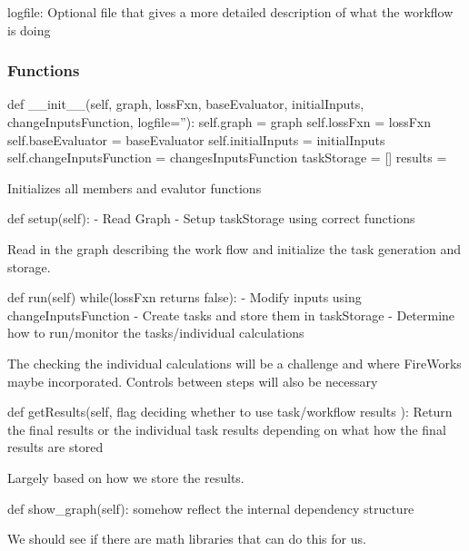 \documentclass [notitlepage, 12pt, a4paper]{article}
\begin{document}
    logfile: Optional file that gives a more detailed description of what the workflow is doing
\subsubsection{Functions}
\begin{python}
def __init__(self, graph, lossFxn, baseEvaluator, initialInputs,
             changeInputsFunction, logfile=''):
    self.graph = graph
    self.lossFxn = lossFxn
    self.baseEvaluator = baseEvaluator
    self.initialInputs = initialInputs
    self.changeInputsFunction = changesInputsFunction
    taskStorage = []
    results = {}

\end{python}
Initializes all members and evalutor functions

\begin{python}
def setup(self):
    - Read Graph
    - Setup taskStorage using correct functions
\end{python}
Read in the graph describing the work flow and initialize the task generation and storage.

\begin{python}
def run(self)
    while(lossFxn returns false):
        - Modify inputs using changeInputsFunction
        - Create tasks and store them in taskStorage
        - Determine how to run/monitor the tasks/individual
          calculations
\end{python}
The checking the individual calculations will be a challenge and where FireWorks maybe incorporated.
Controls between steps will also be necessary

\begin{python}
def getResults(self, flag deciding whether to use task/workflow
               results ):
    Return the final results or the individual task results
    depending on what how the final results are stored
\end{python}
Largely based on how we store the results.

\begin{python}
def show_graph(self):
    somehow reflect the internal dependency structure
\end{python}
We should see if there are math libraries that can do this for us.
\end{document}
